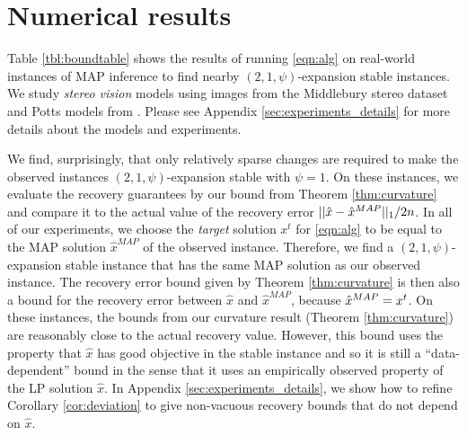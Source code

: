 \section{Numerical results}\label{sec:experiments}
Table \ref{tbl:boundtable} shows the results of running \eqref{eqn:alg} on real-world instances of MAP inference to find nearby $(2,1,\psi)$-expansion stable instances. We study \emph{stereo vision} models using images from the Middlebury stereo dataset \citep{scharstein2002taxonomy} and Potts models from \citet{tappen2003comparison}. Please see Appendix \ref{sec:experiments_details} for more details about the models and experiments.

We find, surprisingly, that only relatively sparse changes are required to make the observed instances $(2,1,\psi)$-expansion stable with  $\psi = 1$.
On these instances, we evaluate the recovery guarantees by our bound from Theorem \ref{thm:curvature} and compare it to the actual value of the recovery error $||\hat{x} - \hat{x}^{MAP}||_1/2n$.
In all of our experiments, we choose the \emph{target} solution $x^t$ for \eqref{eqn:alg} to be equal to the MAP solution $\hat{x}^{MAP}$ of the observed instance.
Therefore, we find a $(2,1,\psi)$-expansion stable instance that has the same MAP solution as our observed instance.
The recovery error bound given by Theorem \ref{thm:curvature} is then also a bound for the recovery error between $\hat{x}$ and $\hat{x}^{MAP}$, because $\hat{x}^{MAP} = x^t$. On these instances, the bounds from our curvature result (Theorem \ref{thm:curvature}) are reasonably close to the actual recovery value. However, this bound uses the property that $\hat{x}$ has good objective in the stable instance and so it is still a ``data-dependent'' bound in the sense that it uses an empirically observed property of the LP solution $\hat{x}$. In Appendix \ref{sec:experiments_details}, we show how to refine Corollary \ref{cor:deviation} to give non-vacuous recovery bounds that do not depend on $\hat{x}$.